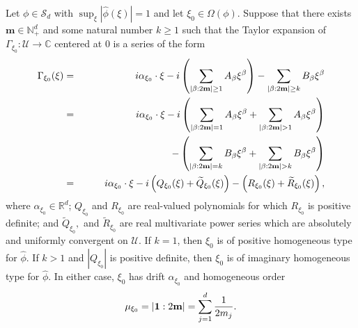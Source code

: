 \documentclass[smallextended]{svjour3}
\theoremstyle{remark}
\newcommand{\lp}{\left(}
\newcommand{\rp}{\right)}
\newcommand{\al}{\alpha}
\newcommand{\be}{\beta}
\begin{document}
\begin{proposition}\label{prop:ExpandGamma}
Let $\phi\in\mathcal{S}_d$ with $\sup_{\xi}|\widehat{\phi}(\xi)|=1$ and let $\xi_0\in\Omega(\phi)$. Suppose that there exists $\mathbf{m}\in \mathbb{N}^d_+$ and some natural number $k \geq 1$ such that the Taylor expansion of $\Gamma_{\xi_0} : \mathcal{U}\to\mathbb{C}$ centered at $0$ is a series of the form
\begin{eqnarray}\label{eq:SemiEllipticImaginaryExpansion}\nonumber
    \Gamma_{\xi_0}(\xi) 
    &=& i\al_{\xi_0} \cdot \xi - i \left( \sum_{\abs{\be : 2\mathbf{m}} \geq 1} A_\be \xi^\be\right) - \sum_{\abs{\be : 2\mathbf{m}} \geq k} B_\be \xi^\be \\ \nonumber
    &=& i\al_{\xi_0} \cdot \xi - i \lp \sum_{\abs{\be : 2\mathbf{m}} = 1} A_\be \xi^\be + \sum_{\abs{\be : 2\mathbf{m}} > 1} A_\be \xi^\be\rp \nonumber\\
    &&\hspace{1.25in} - \lp \sum_{\abs{\be : 2\mathbf{m}} = k} B_\be \xi^\be + \sum_{\abs{\be : 2\mathbf{m}} > k} B_\be \xi^\be \rp \nonumber\\
    &=&  i\al_{\xi_0} \cdot \xi - i\lp Q_{\xi_0}(\xi) + \widetilde{Q}_{\xi_0}(\xi)\rp - \lp R_{\xi_0}(\xi) + \widetilde{R}_{\xi_0}(\xi) \rp,
\end{eqnarray}
where $\al_{\xi_0} \in \mathbb{R}^d$;   $Q_{\xi_0}$ and $R_{\xi_0}$ are real-valued polynomials for which $R_{\xi_0}$ is positive definite; and  $\widetilde{Q}_{\xi_0},$ and $\widetilde{R}_{\xi_0}$ are real multivariate power series which are absolutely and uniformly convergent on $\mathcal{U}$. If $k=1$, then $\xi_0$ is of positive homogeneous type for $\widehat{\phi}$. If $k>1$ and $|Q_{\xi_0}|$ is positive definite, then $\xi_0$ is of imaginary homogeneous type for $\hat{\phi}$. In either case, $\xi_0$ has drift $\alpha_{\xi_0}$ and homogeneous order
\begin{equation*}
    \mu_{\xi_0}=\abs{\mathbf{1}:2\mathbf{m}}=\sum_{j=1}^d\frac{1}{2m_j}.
\end{equation*}
\end{proposition}
\end{document}
